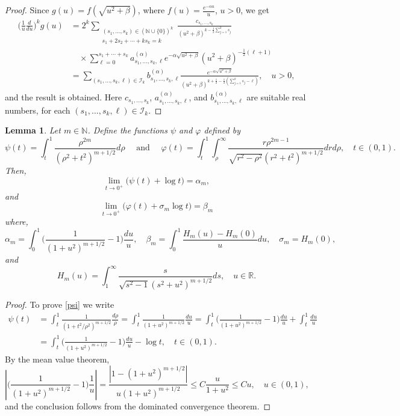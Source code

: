 \documentclass[a4paper,10pt, reqno]{amsart}
\newtheorem{lem}[thm]{Lemma}
\theoremstyle{definition}
\theoremstyle{remark}
\numberwithin{equation}{section}
\begin{document}
{\begin{proof}
Since $g(u)=f(\sqrt{u^2+\beta})$, where $f(u)=\frac{e^{-\alpha u}}{u}$, $u>0$, we get 
\begin{align*}
    \Big(\frac{1}{u}\frac{d}{du}\Big)^kg(u)&=2^k\sum_{\substack{(s_1,\ldots,s_k)\in (\mathbb N\cup\{0\})^k\\s_1+2s_2+\cdots+ks_k=k}}\frac{c_{s_1,\ldots, s_k}}{(u^2+\beta)^{k-\frac{1}{2}\sum_{j=1}^ks_j}}\\
    &\quad \times \sum_{\ell =0}^{s_1+\cdots+s_k}a_{s_1,\ldots,s_k,\ell}^{(\alpha)} e^{-\alpha\sqrt{u^2+\beta}}(u^2+\beta)^{-\frac{1}{2}(\ell +1)}\\
    &=\sum_{(s_1,\ldots, s_k,\ell )\in \mathcal I_k}b_{s_1,\ldots, s_k,\ell}^{(\alpha)}\frac{e^{-\alpha\sqrt{u^2+\beta}}}{(u^2+\beta)^{k+\frac{1}{2}-\frac{1}{2}(\sum_{j=1}^ks_j-\ell)}},\quad u>0,
\end{align*}
and the result is obtained. Here $c_{s_1,\ldots, s_k}$, $a_{s_1,\ldots, s_k,\ell}^{(\alpha)}$, and $b_{s_1,\ldots, s_k,\ell}^{(\alpha)}$ are suitable real numbers, for each  $(s_1,\ldots, s_k,\ell )\in \mathcal I_k$. 
\end{proof}
\begin{lem}\label{psivarphi}
Let $m\in \mathbb N$. Define the functions $\psi$ and $\varphi$  defined by
$$
\psi (t)=\int_t^1\frac{\rho^{2m}}{(\rho^2+t^2)^{m+1/2}}d\rho\quad \mbox{ and }\quad \varphi (t)=\int_t^1\int_\rho ^\infty \frac{r\rho ^{2m-1}}{\sqrt{r^2-\rho ^2}(r^2+t^2)^{m+1/2}}drd\rho,\quad t\in (0,1).
$$
Then,
\begin{equation}\label{psi}
\lim_{t\rightarrow 0^+}\big(\psi (t)+\log t\big)=\alpha _m,
\end{equation}
and 
\begin{equation}\label{varphi}
\lim_{t\rightarrow 0^+}\big(\varphi (t)+\sigma _m\log t\big)=\beta _m
\end{equation}
where, 
$$
\alpha _m=\int_0^1\Big(\frac{1}{(1+u^2)^{m+1/2}}-1\Big)\frac{du}{u},\quad \beta_m=\int_0^1\frac{H_m(u)-H_m(0)}{u}du, \quad \sigma_m=H_m(0),
$$
and
$$
H_m(u)=\int_1^\infty \frac{s}{\sqrt{s^2-1}(s^2+u^2)^{m+1/2}}ds,\quad u\in \mathbb R.
$$
\end{lem}
\begin{proof}
To prove \eqref{psi} we write
\begin{align*}
    \psi (t)&=\int_t^1\frac{1}{(1+t^2/\rho ^2)^{m+1/2}}\frac{d\rho}{\rho }=\int_t^1\frac{1}{(1+u^2)^{m+1/2}}\frac{du}{u}=\int_t^1\Big(\frac{1}{(1+u^2)^{m+1/2}}-1\Big)\frac{du}{u}+\int_t^1\frac{du}{u}\\
    &=\int_t^1\Big(\frac{1}{(1+u^2)^{m+1/2}}-1\Big)\frac{du}{u}-\log t,\quad t\in (0,1).
\end{align*}
By the mean value theorem,
$$
\left|\Big(\frac{1}{(1+u^2)^{m+1/2}}-1\Big)\frac{1}{u}\right|=\frac{|1-(1+u^2)^{m+1/2}|}{u(1+u^2)^{m+1/2}}\leq C\frac{u}{1+u^2}\leq Cu,\quad u\in (0,1),
$$
and the conclusion follows from the dominated convergence theorem.


\end{proof}}
\end{document}
